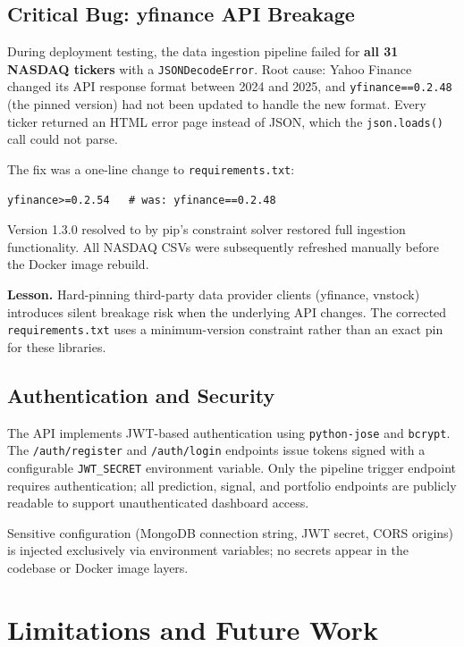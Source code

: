 \documentclass[12pt, a4paper]{article}
\begin{document}
\subsection{Critical Bug: yfinance API Breakage}

During deployment testing, the data ingestion pipeline failed
for \textbf{all 31 NASDAQ tickers} with a \texttt{JSONDecodeError}.
Root cause: Yahoo Finance changed its API response format between
2024 and 2025, and \texttt{yfinance==0.2.48} (the pinned version)
had not been updated to handle the new format. Every ticker
returned an HTML error page instead of JSON, which the
\texttt{json.loads()} call could not parse.

The fix was a one-line change to \texttt{requirements.txt}:
\begin{verbatim}
yfinance>=0.2.54   # was: yfinance==0.2.48
\end{verbatim}

Version 1.3.0 resolved to by pip's constraint solver restored full
ingestion functionality. All NASDAQ CSVs were subsequently refreshed
manually before the Docker image rebuild.

\textbf{Lesson.} Hard-pinning third-party data provider clients
(yfinance, vnstock) introduces silent breakage risk when the
underlying API changes. The corrected \texttt{requirements.txt}
uses a minimum-version constraint rather than an exact pin for
these libraries.

\subsection{Authentication and Security}

The API implements JWT-based authentication using
\texttt{python-jose} and \texttt{bcrypt}. The \texttt{/auth/register}
and \texttt{/auth/login} endpoints issue tokens signed with a
configurable \texttt{JWT\_SECRET} environment variable. Only the
pipeline trigger endpoint requires authentication; all prediction,
signal, and portfolio endpoints are publicly readable to support
unauthenticated dashboard access.

Sensitive configuration (MongoDB connection string, JWT secret,
CORS origins) is injected exclusively via environment variables;
no secrets appear in the codebase or Docker image layers.

\section{Limitations and Future Work}
\end{document}
